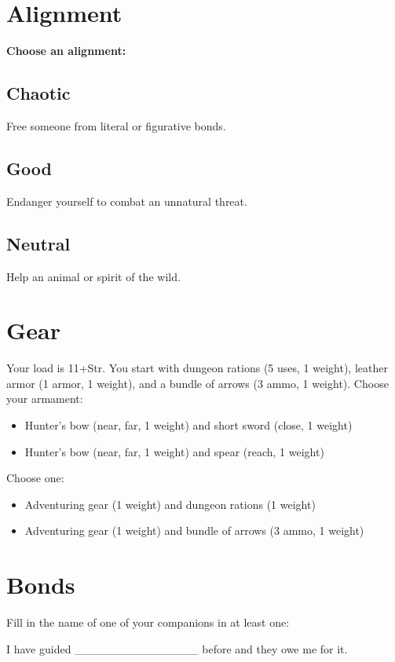 \section*{Alignment}


{\bfseries Choose an alignment:}
\subsection{Chaotic}


 Free someone from literal or figurative bonds.
\subsection{Good}


 Endanger yourself to combat an unnatural threat.
\subsection{Neutral}


 Help an animal or spirit of the wild.
\section*{Gear}


 Your load is 11+Str. You start with dungeon rations (5 uses, 1 weight), leather armor (1 armor, 1 weight), and a bundle of arrows (3 ammo, 1 weight). Choose your armament:
\begin{itemize}
\item Hunter's bow (near, far, 1 weight) and short sword (close, 1 weight)
\item Hunter's bow (near, far, 1 weight) and spear (reach, 1 weight)

\end{itemize}


 Choose one:
\begin{itemize}
\item Adventuring gear (1 weight) and dungeon rations (1 weight)
\item Adventuring gear (1 weight) and bundle of arrows (3 ammo, 1 weight)

\end{itemize}
\section*{Bonds}


 Fill in the name of one of your companions in at least one:


 I have guided \_\_\_\_\_\_\_\_\_\_\_\_\_\_\_ before and they owe me for it.


